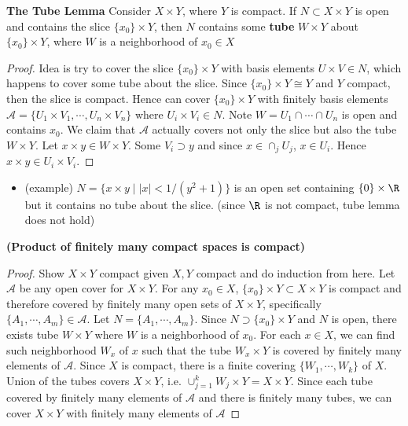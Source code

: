 \documentclass[10.5pt]{article}
\newcommand{\calA}{\mathcal{A}}
\begin{document}
\begin{lemma*}
    \textbf{The Tube Lemma} Consider $X\times Y$, where $Y$ is compact. If $N \subset X\times Y$ is open and contains the slice $\{x_0\} \times Y$, then $N$ contains some \textbf{tube} $W\times Y$ about $\{x_0\}\times Y$, where $W$ is a neighborhood of $x_0\in X$
    \begin{proof}
        Idea is try to cover the slice $\{x_0\} \times Y$ with basis elements $U\times V \in N$, which happens to cover some tube about the slice. Since $\{x_0\}\times Y \cong Y$ and $Y$ compact, then the slice is compact. Hence can cover $\{x_0\}\times Y$ with finitely basis elements $\calA = \{U_1\times V_1, \cdots, U_n \times V_n\}$ where $U_i \times V_i \in N$. Note $W = U_1\cap \cdots \cap U_n$ is open and contains $x_0$. We claim that $\calA$ actually covers not only the slice but also the tube $W\times Y$. Let $x\times y\in W\times Y$. Some $V_i \supset y$ and since $x\in \cap_j U_j$, $x\in U_i$. Hence $x\times y\in U_i \times V_i$. 
    \end{proof}
    \begin{itemize}
        \item (example) $N=\{ x\times y \mid |x| < 1/(y^2 + 1)\}$ is an open set containing $\{0\}\times \R$ but it contains no tube about the slice. (since $\R$ is not compact, tube lemma does not hold)
    \end{itemize}
\end{lemma*}

\begin{theorem*}
    \textbf{(Product of finitely many compact spaces is compact)}
    \begin{proof}
        Show $X\times Y$ compact given $X,Y$ compact and do induction from here. Let $\calA$ be any open cover for $X\times Y$. For any $x_0\in X$, $\{x_0\} \times Y \subset X\times Y$ is compact and therefore covered by finitely many open sets of $X\times Y$, specifically $\{A_1, \cdots, A_m\} \in \calA$. Let $N = \{A_1,\cdots,A_m\}$. Since $N \supset \{x_0\} \times Y$ and $N$ is open, there exists tube $W\times Y$ where $W$ is a neighborhood of $x_0$. For each $x\in X$, we can find such neighborhood $W_x$ of $x$ such that the tube $W_x\times Y$ is covered by finitely many elements of $\calA$. Since $X$ is compact, there is a finite covering $\{W_1, \cdots, W_k\}$ of $X$. Union of the tubes covers $X\times Y$, i.e. $\cup_{j=1}^k W_j \times Y = X\times Y$. Since each tube covered by finitely many elements of $\calA$ and there is finitely many tubes, we can cover $X\times Y$ with finitely many elements of $\calA$
    \end{proof}
\end{theorem*}
\end{document}
